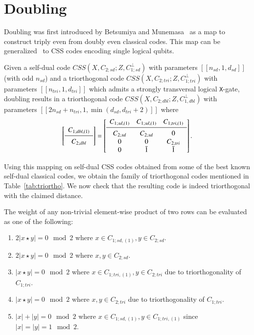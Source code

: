 \documentclass[journal]{IEEEtran}
\newcommand{\X}{\texttt{X}}
\begin{document}
\section{Doubling}\label{sec:doubling}
Doubling was first introduced by Betsumiya and Munemasa~\cite{betsumiya_triply_2012} as a map to construct triply even from doubly even classical codes. This map can be generalized~\cite{bravyi_doubled_2015,sullivan_code_2024}
to CSS codes encoding single logical qubits. 

Given a self-dual code $CSS(X,C_{2;sd};Z,C_{1;sd}^\perp)$ with parameters $[[n_{sd},1,d_{sd}]]$ (with odd $n_{sd}$) and a triorthogonal code $CSS(X,C_{2;tri};Z,C_{1;tri}^\perp)$ with parameters $[[n_{tri},1,d_{tri}]]$ which admits a strongly transversal logical \X-gate, doubling results in a triorthogonal code  $CSS(X,C_{2;dbl};Z,C_{1,dbl}^\perp)$ with parameters $[[2n_{sd}+n_{tri},1,\min(d_{sd},d_{tri}+2)]]$ where
\begin{equation}\label{eqn:dbled_logical}
\left[ \begin{array}{c}
   C_{1;dbl,(1)}  \\
   \midrule
   C_{2;dbl}  \\
\end{array}\right] = 
\left[ \begin{array}{ccc}
  C_{1;sd,(1)} & C_{1;sd,(1)} & C_{1;tri,(1)}  \\
   \midrule
  C_{2;sd} & C_{2;sd} & 0 \\
        0 & 0 & C_{2;tri} \\
        0 & \bar{1} & \bar{1} \\
\end{array}\right].
\end{equation}

Using this mapping on self-dual CSS codes obtained from some of the best known self-dual classical codes, we obtain the family of triorthogonal codes mentioned in Table~\ref{tab:triortho}. We now check that the resulting code is indeed triorthogonal with the claimed distance. 


The weight of any non-trivial element-wise product of two rows can be evaluated as one of the following:
\begin{enumerate}
    \item $2|x\star y| = 0\mod{2}$ where $x\in C_{1;sd,(1)},y\in C_{2;sd}$.
    \item $2|x\star y| = 0 \mod{2}$ where $x,y\in C_{2;sd}$.
    \item $|x\star y| = 0 \mod{2}$ where $x \in C_{1;tri,(1)},y\in C_{2;tri}$ due to triorthogonality of $C_{1;tri}$.
    \item $|x\star y| = 0 \mod{2}$ where $x,y \in C_{2;tri}$ due to triorthogonality of $C_{1;tri}$.
    \item $|x| + |y| = 0 \mod{2}$ where $x \in C_{1;sd,(1)},y \in C_{1;tri,(1)}$ since $|x|=|y|=1\mod{2}$.
    
\end{enumerate}
\end{document}
